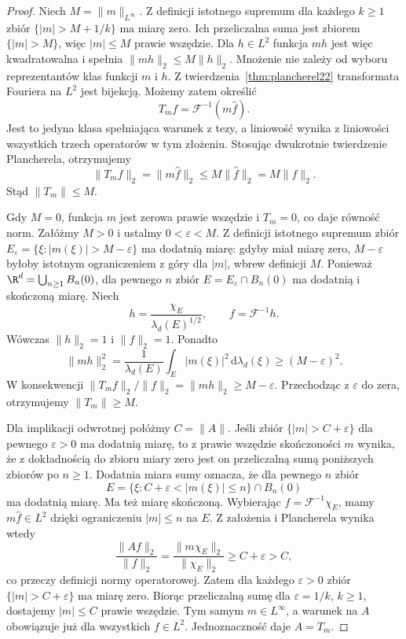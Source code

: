 \begin{proof}
Niech $M=\|m\|_{L^\infty}$. Z definicji istotnego
supremum dla każdego $k\ge1$ zbiór
$\{|m|>M+1/k\}$ ma miarę zero.
Ich przeliczalna suma jest zbiorem $\{|m|>M\}$,
więc $|m|\le M$ prawie wszędzie.
Dla $h\in L^2$ funkcja $mh$ jest więc kwadratowalna
i spełnia $\|mh\|_2\le M\|h\|_2$.
Mnożenie nie zależy od wyboru reprezentantów
klas funkcji $m$ i $h$.
Z twierdzenia~\ref{thm:plancherel22}
transformata Fouriera na $L^2$ jest bijekcją.
Możemy zatem określić
\[
 T_mf=\mathcal F^{-1}(m\widehat f).
\]
Jest to jedyna klasa spełniająca warunek
z tezy, a liniowość wynika z liniowości
wszystkich trzech operatorów w tym złożeniu.
Stosując dwukrotnie twierdzenie Plancherela,
otrzymujemy
\[
 \|T_mf\|_2=\|m\widehat f\|_2
 \le M\|\widehat f\|_2
 =M\|f\|_2.
\]
Stąd $\|T_m\|\le M$.

Gdy $M=0$, funkcja $m$ jest zerowa prawie
wszędzie i $T_m=0$, co daje równość norm.
Załóżmy $M>0$ i ustalmy $0<\varepsilon<M$.
Z definicji istotnego supremum zbiór
$E_\varepsilon=\{\xi:|m(\xi)|>M-\varepsilon\}$
ma dodatnią miarę: gdyby miał miarę zero,
$M-\varepsilon$ byłoby istotnym ograniczeniem
z góry dla $|m|$, wbrew definicji $M$.
Ponieważ $\R^d=\bigcup_{n\ge1}B_n(0)$,
dla pewnego $n$ zbiór
$E=E_\varepsilon\cap B_n(0)$ ma dodatnią
i skończoną miarę. Niech
\[
 h=\frac{\chi_E}{\lambda_d(E)^{1/2}},
 \qquad f=\mathcal F^{-1}h.
\]
Wówczas $\|h\|_2=1$ i
$\|f\|_2=1$. Ponadto
\[
 \|mh\|_2^2
 =\frac1{\lambda_d(E)}\int_E|m(\xi)|^2
 \,\mathrm d\lambda_d(\xi)
 \ge(M-\varepsilon)^2.
\]
W konsekwencji
$\|T_mf\|_2/\|f\|_2=\|mh\|_2\ge M-\varepsilon$.
Przechodząc z $\varepsilon$ do zera,
otrzymujemy $\|T_m\|\ge M$.

Dla implikacji odwrotnej połóżmy $C=\|A\|$.
Jeśli zbiór $\{|m|>C+\varepsilon\}$ dla pewnego
$\varepsilon>0$ ma dodatnią miarę, to z
prawie wszędzie skończoności $m$ wynika, że
z dokładnością do zbioru miary zero jest on
przeliczalną sumą poniższych zbiorów po $n\ge1$.
Dodatnia miara sumy oznacza, że dla pewnego $n$ zbiór
\[
 E=\{\xi:C+\varepsilon<|m(\xi)|\le n\}
       \cap B_n(0)
\]
ma dodatnią miarę. Ma też miarę skończoną.
Wybierając $f=\mathcal F^{-1}\chi_E$,
mamy $m\widehat f\in L^2$ dzięki ograniczeniu
$|m|\le n$ na $E$. Z założenia i Plancherela
wynika wtedy
\[
 \frac{\|Af\|_2}{\|f\|_2}
 =\frac{\|m\chi_E\|_2}{\|\chi_E\|_2}
 \ge C+\varepsilon>C,
\]
co przeczy definicji normy operatorowej.
Zatem dla każdego $\varepsilon>0$ zbiór
$\{|m|>C+\varepsilon\}$ ma miarę zero.
Biorąc przeliczalną sumę dla
$\varepsilon=1/k$, $k\ge1$, dostajemy
$|m|\le C$ prawie wszędzie. Tym samym
$m\in L^\infty$, a warunek na $A$ obowiązuje
już dla wszystkich $f\in L^2$.
Jednoznaczność daje $A=T_m$.
\end{proof}

